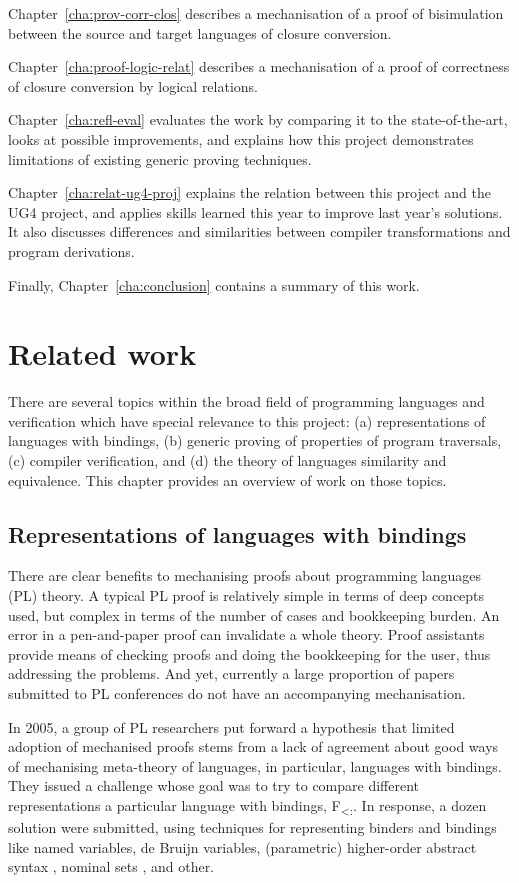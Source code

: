 \documentclass[bsc,frontabs,oneside,singlespacing,parskip,deptreport]{infthesis}
\theoremstyle{definition}
\theoremstyle{lemma}
\begin{document}
Chapter~\ref{cha:prov-corr-clos} describes a mechanisation of a proof
of bisimulation between the source and target languages of closure
conversion.

Chapter~\ref{cha:proof-logic-relat} describes a mechanisation of a
proof of correctness of closure conversion by logical relations.

Chapter~\ref{cha:refl-eval} evaluates the work by comparing it to the
state-of-the-art, looks at possible improvements, and explains how
this project demonstrates limitations of existing generic proving
techniques.

Chapter~\ref{cha:relat-ug4-proj} explains the relation between this
project and the UG4 project, and applies skills learned this year to
improve last year's solutions. It also discusses differences and
similarities between compiler transformations and program
derivations.

Finally, Chapter~\ref{cha:conclusion} contains a summary of this
work. 

\chapter{Related work}
\label{cha:related-work}

There are several topics within the broad field of programming
languages and verification which have special relevance to this
project: (a) representations of languages with bindings, (b) generic
proving of properties of program traversals, (c) compiler
verification, and (d) the theory of languages similarity and
equivalence. This chapter provides an overview of work on those
topics.

\section{Representations of languages with bindings}
\label{sec:repr-lang-with}

There are clear benefits to mechanising proofs about programming
languages (PL) theory. A typical PL proof is relatively simple in
terms of deep concepts used, but complex in terms of the number of
cases and bookkeeping burden. An error in a pen-and-paper proof can
invalidate a whole theory. Proof assistants provide means of checking
proofs and doing the bookkeeping for the user, thus addressing the
problems. And yet, currently a large proportion of papers submitted to
PL conferences do not have an accompanying mechanisation.

In 2005, a group of PL researchers put forward a hypothesis that
limited adoption of mechanised proofs stems from a lack of agreement
about good ways of mechanising meta-theory of languages, in
particular, languages with bindings. They issued a challenge
\cite{poplmarkreloaded} whose goal was to try to compare different
representations a particular language with bindings,
F\textsubscript{<:}. In response, a dozen solution were submitted,
using techniques for representing binders and bindings like named
variables, de Bruijn variables, (parametric) higher-order abstract
syntax \cite{DBLP:conf/pldi/PfenningE88}
\cite{DBLP:conf/icfp/Chlipala08}, nominal sets
\cite{pitts2013nominal}, and other.
\end{document}
